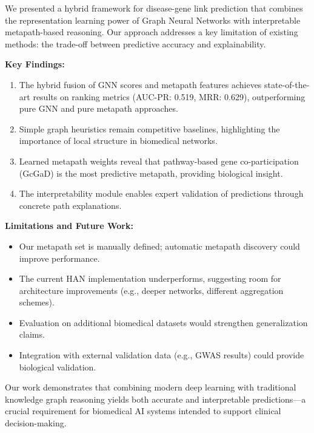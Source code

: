 \documentclass{article}
\begin{document}
We presented a hybrid framework for disease-gene link prediction that combines the representation learning power of Graph Neural Networks with interpretable metapath-based reasoning. Our approach addresses a key limitation of existing methods: the trade-off between predictive accuracy and explainability.

\textbf{Key Findings:}
\begin{enumerate}
    \item The hybrid fusion of GNN scores and metapath features achieves state-of-the-art results on ranking metrics (AUC-PR: 0.519, MRR: 0.629), outperforming pure GNN and pure metapath approaches.

    \item Simple graph heuristics remain competitive baselines, highlighting the importance of local structure in biomedical networks.

    \item Learned metapath weights reveal that pathway-based gene co-participation (GcGaD) is the most predictive metapath, providing biological insight.

    \item The interpretability module enables expert validation of predictions through concrete path explanations.
\end{enumerate}

\textbf{Limitations and Future Work:}
\begin{itemize}
    \item Our metapath set is manually defined; automatic metapath discovery could improve performance.
    \item The current HAN implementation underperforms, suggesting room for architecture improvements (e.g., deeper networks, different aggregation schemes).
    \item Evaluation on additional biomedical datasets would strengthen generalization claims.
    \item Integration with external validation data (e.g., GWAS results) could provide biological validation.
\end{itemize}

Our work demonstrates that combining modern deep learning with traditional knowledge graph reasoning yields both accurate and interpretable predictions---a crucial requirement for biomedical AI systems intended to support clinical decision-making.

\end{document}
